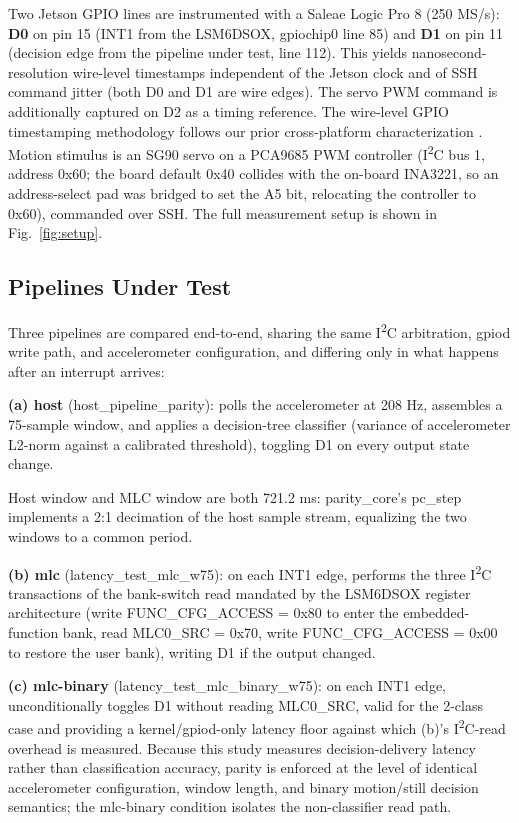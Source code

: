 Two Jetson GPIO lines are instrumented with a Saleae Logic Pro 8 (250 MS/s): \textbf{D0} on pin 15 (INT1 from the LSM6DSOX, gpiochip0 line 85) and \textbf{D1} on pin 11 (decision edge from the pipeline under test, line 112). This yields nanosecond-resolution wire-level timestamps independent of the Jetson clock and of SSH command jitter (both D0 and D1 are wire edges). The servo PWM command is additionally captured on D2 as a timing reference. The wire-level GPIO timestamping methodology follows our prior cross-platform characterization \cite{ref9}. Motion stimulus is an SG90 servo on a PCA9685 PWM controller (I\textsuperscript{2}C bus 1, address 0x60; the board default 0x40 collides with the on-board INA3221, so an address-select pad was bridged to set the A5 bit, relocating the controller to 0x60), commanded over SSH. The full measurement setup is shown in Fig.~\ref{fig:setup}.

\subsection{Pipelines Under Test}

Three pipelines are compared end-to-end, sharing the same I\textsuperscript{2}C arbitration, gpiod write path, and accelerometer configuration, and differing only in what happens after an interrupt arrives:

\textbf{(a) host} (host\_pipeline\_parity): polls the accelerometer at 208 Hz, assembles a 75-sample window, and applies a decision-tree classifier (variance of accelerometer L2-norm against a calibrated threshold), toggling D1 on every output state change.

Host window and MLC window are both 721.2 ms: parity\_core's pc\_step implements a 2:1 decimation of the host sample stream, equalizing the two windows to a common period.

\textbf{(b) mlc} (latency\_test\_mlc\_w75): on each INT1 edge, performs the three I\textsuperscript{2}C transactions of the bank-switch read mandated by the LSM6DSOX register architecture \cite{ref2} (write FUNC\_CFG\_ACCESS = 0x80 to enter the embedded-function bank, read MLC0\_SRC = 0x70, write FUNC\_CFG\_ACCESS = 0x00 to restore the user bank), writing D1 if the output changed.

\textbf{(c) mlc-binary} (latency\_test\_mlc\_binary\_w75): on each INT1 edge, unconditionally toggles D1 without reading MLC0\_SRC, valid for the 2-class case and providing a kernel/gpiod-only latency floor against which (b)'s I\textsuperscript{2}C-read overhead is measured. Because this study measures decision-delivery latency rather than classification accuracy, parity is enforced at the level of identical accelerometer configuration, window length, and binary motion/still decision semantics; the mlc-binary condition isolates the non-classifier read path.

